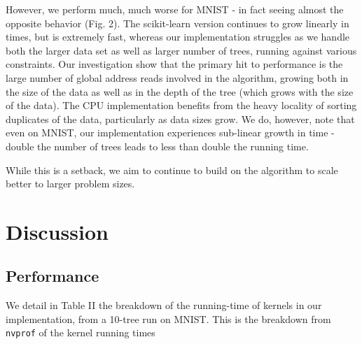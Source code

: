 \documentclass[10pt,conference]{IEEEtran}
\begin{document}
However, we perform much, much worse for MNIST - in fact seeing almost the opposite behavior (Fig. 2). The scikit-learn version continues to grow linearly in times, but is extremely fast, whereas our implementation struggles as we handle both the larger data set as well as larger number of trees, running against various constraints. Our investigation show that the primary hit to performance is the large number of global address reads involved in the algorithm, growing both in the size of the data as well as in the depth of the tree (which grows with the size of the data). The CPU implementation benefits from the heavy locality of sorting duplicates of the data, particularly as data sizes grow. We do, however, note that even on MNIST, our implementation experiences sub-linear growth in time - double the number of trees leads to less than double the running time.

While this is a setback, we aim to continue to build on the algorithm to scale better to larger problem sizes.

\section{Discussion}
  
  \subsection{Performance}
  
    We detail in Table II the breakdown of the running-time of kernels in our implementation, from a 10-tree run on MNIST. This is the breakdown from \texttt{nvprof} of the kernel running times
    
\end{document}
